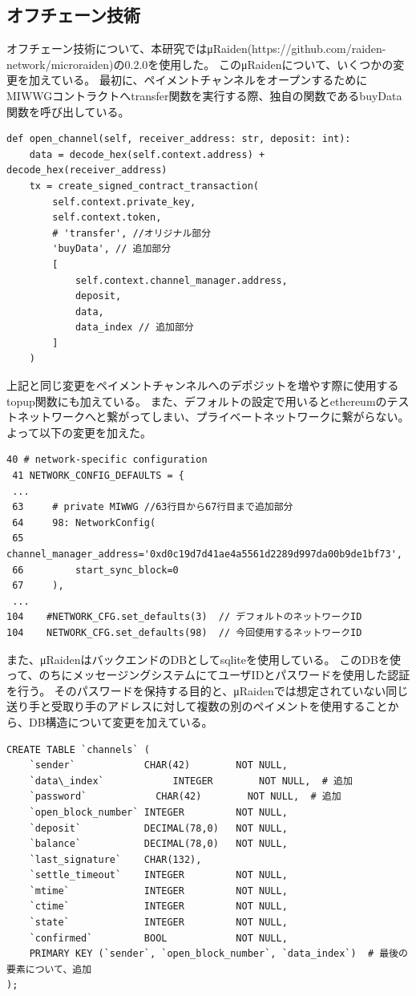 \subsection{オフチェーン技術}
オフチェーン技術について、本研究ではμRaiden(https://github.com/raiden-network/microraiden)の0.2.0を使用した。
このμRaidenについて、いくつかの変更を加えている。
最初に、ペイメントチャンネルをオープンするためにMIWWGコントラクトへtransfer関数を実行する際、独自の関数であるbuyData関数を呼び出している。
\begin{lstlisting}[caption=μRaidenクライアントの変更 client/client.py  ,label=RaidenOpenChannel]
def open_channel(self, receiver_address: str, deposit: int):
    data = decode_hex(self.context.address) + decode_hex(receiver_address)
    tx = create_signed_contract_transaction(
        self.context.private_key,
        self.context.token,
        # 'transfer', //オリジナル部分
        'buyData', // 追加部分
        [
            self.context.channel_manager.address,
            deposit,
            data,
            data_index // 追加部分
        ]
    )
\end{lstlisting}
上記と同じ変更をペイメントチャンネルへのデポジットを増やす際に使用するtopup関数にも加えている。
また、デフォルトの設定で用いるとethereumのテストネットワークへと繋がってしまい、プライベートネットワークに繋がらない。
よって以下の変更を加えた。
\begin{lstlisting}[caption=ネットワーク設定の変更 config.py  ,label=RaidenOpenChannel]
 40 # network-specific configuration
 41 NETWORK_CONFIG_DEFAULTS = {
 ...
 63     # private MIWWG //63行目から67行目まで追加部分
 64     98: NetworkConfig(
 65         channel_manager_address='0xd0c19d7d41ae4a5561d2289d997da00b9de1bf73',
 66         start_sync_block=0
 67     ),
 ...
104    #NETWORK_CFG.set_defaults(3)  // デフォルトのネットワークID
104    NETWORK_CFG.set_defaults(98)  // 今回使用するネットワークID
\end{lstlisting}
また、μRaidenはバックエンドのDBとしてsqliteを使用している。
このDBを使って、のちにメッセージングシステムにてユーザIDとパスワードを使用した認証を行う。
そのパスワードを保持する目的と、μRaidenでは想定されていない同じ送り手と受取り手のアドレスに対して複数の別のペイメントを使用することから、DB構造について変更を加えている。
\begin{lstlisting}[caption=DB構造の変更 channel\_manager/state.py  ,label=sqliteSql]
CREATE TABLE `channels` (
    `sender`            CHAR(42)        NOT NULL,
    `data\_index`            INTEGER        NOT NULL,  # 追加
    `password`            CHAR(42)        NOT NULL,  # 追加
    `open_block_number` INTEGER         NOT NULL,
    `deposit`           DECIMAL(78,0)   NOT NULL,
    `balance`           DECIMAL(78,0)   NOT NULL,
    `last_signature`    CHAR(132),
    `settle_timeout`    INTEGER         NOT NULL,
    `mtime`             INTEGER         NOT NULL,
    `ctime`             INTEGER         NOT NULL,
    `state`             INTEGER         NOT NULL,
    `confirmed`         BOOL            NOT NULL,
    PRIMARY KEY (`sender`, `open_block_number`, `data_index`)  # 最後の要素について、追加
);
\end{lstlisting}
